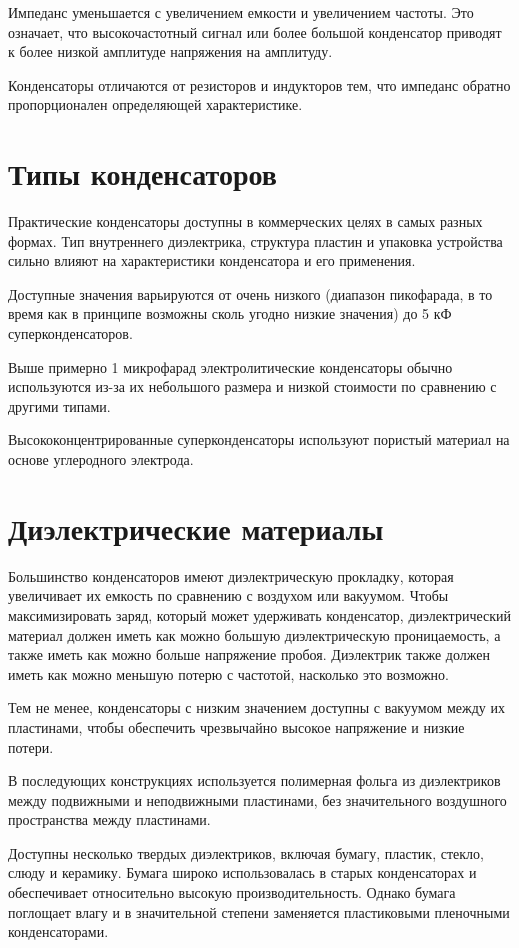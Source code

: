 Импеданс уменьшается с увеличением емкости и увеличением частоты. Это означает, что высокочастотный сигнал или более большой конденсатор приводят к более низкой амплитуде напряжения на амплитуду. 

Конденсаторы отличаются от резисторов и индукторов тем, что импеданс обратно пропорционален определяющей характеристике.

\chapter{Типы конденсаторов}
Практические конденсаторы доступны в коммерческих целях в самых разных формах. Тип внутреннего диэлектрика, структура пластин и упаковка устройства сильно влияют на характеристики конденсатора и его применения.

Доступные значения варьируются от очень низкого (диапазон пикофарада, в то время как в принципе возможны сколь угодно низкие значения) до 5 кФ суперконденсаторов.

Выше примерно 1 микрофарад электролитические конденсаторы обычно используются из-за их небольшого размера и низкой стоимости по сравнению с другими типами.

Высококонцентрированные суперконденсаторы используют пористый материал на основе углеродного электрода.

\chapter{Диэлектрические материалы}

Большинство конденсаторов имеют диэлектрическую прокладку, которая увеличивает их емкость по сравнению с воздухом или вакуумом. Чтобы максимизировать заряд, который может удерживать конденсатор, диэлектрический материал должен иметь как можно большую диэлектрическую проницаемость, а также иметь как можно больше напряжение пробоя. Диэлектрик также должен иметь как можно меньшую потерю с частотой, насколько это возможно.

Тем не менее, конденсаторы с низким значением доступны с вакуумом между их пластинами, чтобы обеспечить чрезвычайно высокое напряжение и низкие потери. 

В последующих конструкциях используется полимерная фольга из диэлектриков между подвижными и неподвижными пластинами, без значительного воздушного пространства между пластинами.

Доступны несколько твердых диэлектриков, включая бумагу, пластик, стекло, слюду и керамику. Бумага широко использовалась в старых конденсаторах и обеспечивает относительно высокую производительность. Однако бумага поглощает влагу и в значительной степени заменяется пластиковыми пленочными конденсаторами.


